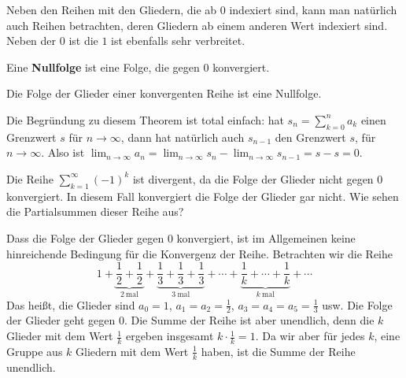 \begin{bem}
	Neben den Reihen mit den Gliedern, die ab $0$ indexiert sind, kann man natürlich auch Reihen betrachten, deren Gliedern ab einem anderen Wert indexiert sind. Neben der $0$ ist die $1$ ist ebenfalls sehr verbreitet. 
\end{bem} 

\begin{defn} 
	Eine \textbf{Nullfolge} ist eine Folge, die gegen $0$ konvergiert. 
\end{defn} 

\begin{thm} 
	Die Folge der Glieder einer konvergenten Reihe ist eine Nullfolge. 
\end{thm} 

\begin{bem}
	Die Begründung zu diesem Theorem ist total einfach: hat $s_n = \sum_{k=0}^n a_k$ einen Grenzwert $s$ für $n \to \infty$, dann hat natürlich auch $s_{n-1}$ den Grenzwert $s$, für $n \to \infty$. Also ist $\lim_{n \to \infty} a_n = \lim_{n \to \infty} s_n - \lim_{n \to \infty} s_{n-1} = s-s = 0$. 
\end{bem} 

\begin{bsp} 
	Die Reihe $\sum_{k=1}^\infty (-1)^k$ ist divergent, da die Folge der Glieder nicht gegen $0$ konvergiert. In diesem Fall konvergiert die Folge der Glieder gar nicht. Wie sehen die Partialsummen dieser Reihe aus? 
\end{bsp} 


\begin{bsp} 
	Dass die Folge der Glieder gegen $0$ konvergiert, ist im Allgemeinen keine hinreichende Bedingung für die Konvergenz der Reihe. Betrachten wir die Reihe 
	\[
	1 + \underbrace{\frac{1}{2} + \frac{1}{2}}_{2 \ \text{mal}} + \underbrace{\frac{1}{3} + \frac{1}{3}+ \frac{1}{3}}_{3 \ \text{mal}}  +  \cdots +  \underbrace{\frac{1}{k} + \cdots + \frac{1}{k}}_{k \ \text{mal}} + \cdots 
	\]
	Das heißt, die Glieder sind $a_0=1$, $a_1 = a_2 = \frac{1}{2}$, $a_3=a_4=a_5 = \frac{1}{3}$ usw. Die Folge der Glieder geht gegen $0$. Die Summe der Reihe ist aber unendlich, denn die $k$ Glieder mit dem Wert $\frac{1}{k}$ ergeben insgesamt $k \cdot \frac{1}{k} = 1$. Da wir aber für jedes $k$, eine Gruppe aus $k$ Gliedern mit dem Wert $\frac{1}{k}$ haben, ist die Summe der Reihe unendlich. 
\end{bsp} 

